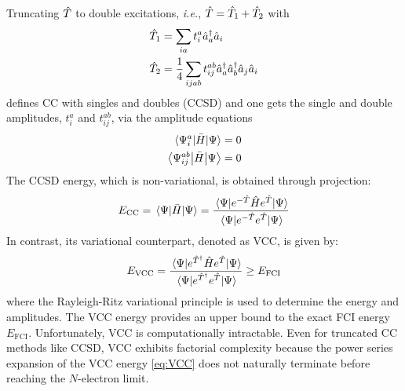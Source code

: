 \documentclass[aip,jcp,reprint,noshowkeys,superscriptaddress]{revtex4-1}
\newcommand{\ie}{\textit{i.e.}}
\newcommand{\hT}{\Hat{T}}
\begin{document}
Truncating $\hT$ to double excitations, \ie, $\hT = \hT_1 + \hT_2$ with 
\begin{subequations}
\begin{align}
	\hT_1 & = \sum_{ia} t_{i}^{a} \Hat{a}_a^{\dag} \Hat{a}_i
        \\
	\hT_2 & = \frac{1}{4} \sum_{ijab} t_{ij}^{ab} \Hat{a}_a^{\dag} \Hat{a}_b^{\dag} \Hat{a}_j \Hat{a}_i
\end{align}
\end{subequations}
defines CC with singles and doubles (CCSD) and one gets the single and double amplitudes, $t_{i}^{a}$ and $t_{ij}^{ab}$, via the amplitude equations
\begin{subequations}
\begin{align}
	\label{eq:T1_eq}
	\mel{\Psi_{i}^{a}}{\Bar{H}}{\Psi} & = 0
	\\
	\label{eq:T2_eq}
	\mel{\Psi_{ij}^{ab}}{\Bar{H}}{\Psi} & = 0
\end{align}
\end{subequations}
The CCSD energy, which is non-variational, is obtained through projection:
\begin{equation}
	E_\text{CC}
	= \mel{\Psi}{\bar{H}}{\Psi}
	= \frac{ \mel{\Psi}{ e^{-\hat{T}} \hat{H} e^{\hat{T}} } {\Psi} }{ \mel{\Psi}{ e^{-\hat{T}} e^{\hat{T}} }{\Psi} }
\end{equation}
In contrast, its variational counterpart, denoted as VCC, is given by:
\begin{equation}
\label{eq:VCC}
	E_\text{VCC}
	= \frac{\mel{\Psi}{e^{\hat{T}^\dagger} \hat{H} e^{\hat{T}}}{\Psi}}{\mel{\Psi}{e^{\hat{T}^\dagger} e^{\hat{T}}}{\Psi}}
	\ge E_\text{FCI}
\end{equation}
where the Rayleigh-Ritz variational principle is used to determine the energy and amplitudes. The VCC energy provides an upper bound to the exact FCI energy $E_\text{FCI}$. Unfortunately, VCC is computationally intractable. Even for truncated CC methods like CCSD, VCC exhibits factorial complexity because the power series expansion of the VCC energy \eqref{eq:VCC} does not naturally terminate before reaching the $N$-electron limit.


\end{document}
